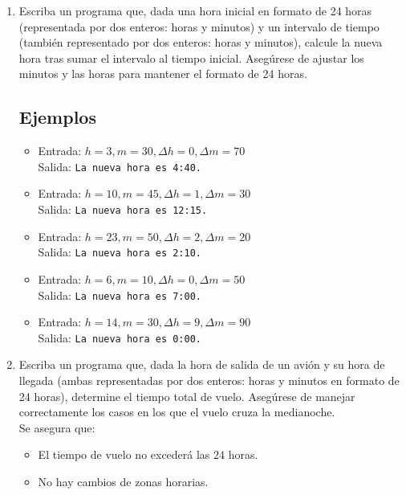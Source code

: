 \begin{enumerate}[label=\alph*)]
    \item Escriba un programa que, dada una hora inicial en formato de 24 horas (representada por dos enteros: horas y minutos) y un intervalo de tiempo (también representado por dos enteros: horas y minutos), calcule la nueva hora tras sumar el intervalo al tiempo inicial. Asegúrese de ajustar los minutos y las horas para mantener el formato de 24 horas.
    \subsection*{Ejemplos}
    \begin{itemize}
        \item Entrada: \(h = 3, m = 30, \Delta h = 0, \Delta m = 70\)\\
              Salida: \texttt{La nueva hora es 4:40.}
        \item Entrada: \(h = 10, m = 45, \Delta h = 1, \Delta m = 30\)\\
              Salida: \texttt{La nueva hora es 12:15.}
        \item Entrada: \(h = 23, m = 50, \Delta h = 2, \Delta m = 20\)\\
              Salida: \texttt{La nueva hora es 2:10.}
        \item Entrada: \(h = 6, m = 10, \Delta h = 0, \Delta m = 50\)\\
              Salida: \texttt{La nueva hora es 7:00.}
        \item Entrada: \(h = 14, m = 30, \Delta h = 9, \Delta m = 90\)\\
              Salida: \texttt{La nueva hora es 0:00.}
    \end{itemize}

    \item Escriba un programa que, dada la hora de salida de un avión y su hora de llegada (ambas representadas por dos enteros: horas y minutos en formato de 24 horas), determine el tiempo total de vuelo. Asegúrese de manejar correctamente los casos en los que el vuelo cruza la medianoche.\\
    Se asegura que:
    \begin{itemize}
        \item El tiempo de vuelo no excederá las \(24\) horas.
        \item No hay cambios de zonas horarias.
    \end{itemize}

\end{enumerate}
